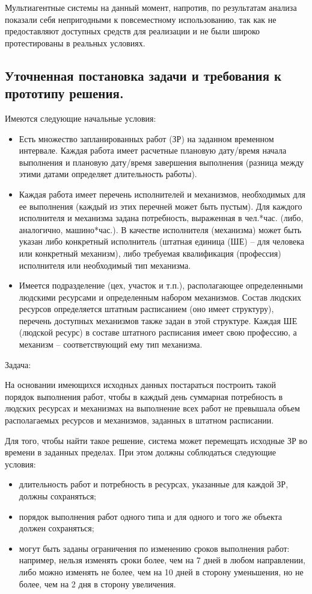 Мультиагентные системы на данный момент, напротив, по результатам анализа показали себя непригодными к повсеместному использованию, так как не предоставляют доступных средств для реализации и не были широко протестированы в реальных условиях.


\subsection{Уточненная постановка задачи и требования к прототипу решения.}
Имеются следующие начальные условия:
\begin{itemize}
	\item Есть множество запланированных работ (ЗР) на заданном временном интервале. Каждая работа имеет расчетные плановую дату/время начала выполнения и плановую дату/время завершения выполнения (разница между этими датами определяет длительность работы).
	\item Каждая работа имеет перечень исполнителей и механизмов, необходимых для ее выполнения (каждый из этих перечней может быть пустым). Для каждого исполнителя и механизма задана потребность, выраженная в чел.*час. (либо, аналогично, машино*час.).  В качестве исполнителя (механизма) может быть указан либо конкретный исполнитель (штатная единица (ШЕ) – для человека или конкретный механизм), либо требуемая квалификация (профессия) исполнителя или необходимый тип механизма.
	\item Имеется подразделение (цех, участок и т.п.), располагающее определенными людскими ресурсами и определенным набором механизмов. Состав людских ресурсов определяется штатным расписанием (оно имеет структуру), перечень доступных механизмов также задан в этой структуре. Каждая ШЕ (людской ресурс) в составе штатного расписания имеет свою профессию, а механизм – соответствующий ему тип механизма.
\end{itemize}
	Задача:
	
	На основании имеющихся исходных данных постараться построить такой порядок выполнения работ, чтобы в каждый день суммарная потребность в людских ресурсах и механизмах на выполнение всех работ не превышала объем располагаемых ресурсов и механизмов, заданных в штатном расписании.
	
	Для того, чтобы найти такое решение, система может перемещать исходные ЗР во времени в заданных пределах. При этом должны соблюдаться следующие условия:
	\begin{itemize}
		\item длительность работ и потребность в ресурсах, указанные для каждой ЗР, должны сохраняться;
		\item порядок выполнения работ одного типа и для одного и того же объекта должен сохраняться;
		\item могут быть заданы ограничения по изменению сроков выполнения работ: например, нельзя изменять сроки более, чем на 7 дней в любом направлении, либо можно изменять не более, чем на 10 дней в сторону уменьшения, но не более, чем на 2 дня в сторону увеличения.
	\end{itemize}

